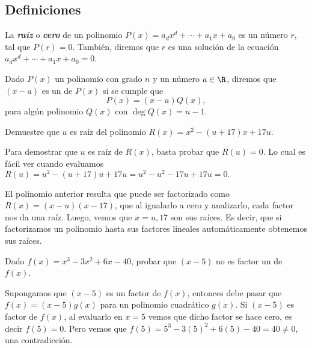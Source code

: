 \subsection{Definiciones}

\begin{definition}
    La \textbf{\emph{raíz}} o \textbf{\emph{cero}} de un polinomio $P(x) = a_d x^d + \cdots + a_1 x + a_0$ es un número $r$, tal que $P(r) = 0$.
    También, diremos que $r$ es una solución de la ecuación $ a_d x^d + \cdots + a_1 x + a_0 = 0$.
\end{definition}

\begin{definition}
    Dado $P(x)$ un polinomio con grado $n$ y un número $a \in \R$, diremos que $(x - a)$ es un  de $P(x)$ si se cumple que
    \[
        P(x) = (x - a)Q(x),
    \]
    para algún polinomio $Q(x)$ con $\deg Q(x) = n - 1$.
\end{definition}

\begin{example}
    Demuestre que $u$ es raíz del polinomio $R(x) = x^2 - (u + 17) x + 17u$.
\end{example}
\begin{solution}
    Para demostrar que $u$ es raíz de $R(x)$, basta probar que $R(u) = 0$.
    Lo cual es fácil ver cuando evaluamos $R(u) = u^2 - (u+17)u + 17u = u^2 - u^2 - 17u + 17u = 0.$
\end{solution}

El polinomio anterior resulta que puede ser factorizado como $R(x) = (x - u)(x - 17)$, que al igualarlo a cero y analizarlo, cada factor nos da una raíz.
Luego, vemos que $x = u, 17$ son sus raíces.
Es decir, que si factorizamos un polinomio hasta sus factores lineales automáticamente obtenemos sus raíces.

\begin{example}
    Dado $f(x) = x^3 - 3x^2 + 6x - 40$, probar que $(x - 5)$ no es factor un de $f(x)$.
\end{example}
\begin{solution}
    Supongamos que $(x - 5)$ es un factor de $f(x)$, entonces debe pasar que $f(x) = (x - 5)g(x)$ para un polinomio cuadrático $g(x)$.
    Si $(x - 5)$ es factor de $f(x)$, al evaluarlo en $x = 5$ vemos que dicho factor se hace cero, es decir $f(5) = 0$.
    Pero vemos que $f(5) = 5^3 - 3(5)^2 + 6(5) - 40 = 40 \neq 0$, una contradicción.
\end{solution}

